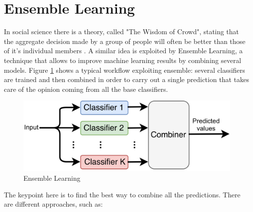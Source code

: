 \section{Ensemble Learning}
\label{sec:ensemble}
In social science there is a theory, called "The Wisdom of Crowd", stating that the aggregate decision made by a group of people will often be better than those of it's individual members \cite{crowd}. A similar idea is exploited by Ensemble Learning, a technique that allows to improve machine learning results by combining several models. Figure \ref{fig:eleventh_figure} shows a typical workflow exploiting ensemble: several classifiers are trained and then combined in order to carry out a single prediction that takes care of the opinion coming from all the base classifiers. 
\begin{figure}[htbp!]
\centering
\includegraphics[scale=0.35]{Tesi/images/Ensemble.pdf}
\caption{Ensemble Learning}
\label{fig:eleventh_figure}
\end{figure}
The keypoint here is to find the best way to combine all the predictions. There are  different approaches, such as:
